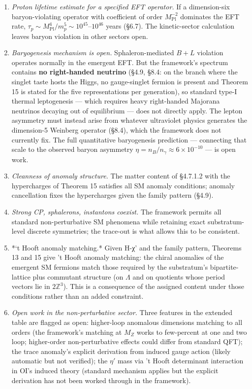 \documentclass[
]{article}
\begin{document}
\begin{enumerate}
\def\labelenumi{(\roman{enumi})}
\item
  \emph{Proton lifetime estimate for a specified EFT operator.} If a
  dimension-six baryon-violating operator with coefficient of order
  \(M_{\mathrm{Pl}}^{-2}\) dominates the EFT rate,
  \(\tau_p \sim M_{\mathrm{Pl}}^4/m_p^5 \sim 10^{45}\)--\(10^{46}\)
  years (§6.7). The kinetic-sector calculation leaves baryon violation
  in other sectors open.
\item
  \emph{Baryogenesis mechanism is open.} Sphaleron-mediated \(B+L\)
  violation operates normally in the emergent EFT. But the framework's
  spectrum contains \textbf{no right-handed neutrino} (§4.9, §8.4: on
  the branch where the singlet taste hosts the Higgs, no gauge-singlet
  fermion is present and Theorem 15 is stated for the five
  representations per generation), so standard type-I thermal
  leptogenesis --- which requires heavy right-handed Majorana neutrinos
  decaying out of equilibrium --- does not directly apply. The lepton
  asymmetry must instead arise from whatever ultraviolet physics
  generates the dimension-5 Weinberg operator (§8.4), which the
  framework does not currently fix. The full quantitative baryogenesis
  prediction --- connecting that scale to the observed baryon asymmetry
  \(\eta = n_B/n_\gamma \approx 6 \times 10^{-10}\) --- is open work.
\item
  \emph{Cleanness of anomaly structure.} The matter content of §4.7.1.2
  with the hypercharges of Theorem 15 satisfies all SM anomaly
  conditions; anomaly cancellation fixes the hypercharges given the
  family pattern (§4.9).
\item
  \emph{Strong CP, sphalerons, instantons coexist.} The framework
  permits all standard non-perturbative SM phenomena while retaining
  exact substratum-level discrete symmetries; the trace-out is what
  allows this to be consistent.
\item
  *`t Hooft anomaly matching.* Given H-χ' and the family pattern,
  Theorems 13 and 15 give 't Hooft anomaly matching: the chiral
  anomalies of the emergent SM fermions match those required by the
  substratum's bipartite-lattice plus commutant structure (on
  \(\Lambda\) and on quotients whose period vectors lie in
  \(2\mathbb Z^3\)). This is a consequence of the assigned content under
  those conditions rather than an added constraint.
\item
  \emph{Open work in the non-perturbative sector.} Three features in the
  extended table are flagged as open: higher-loop anomalous dimensions
  matching to all orders (the framework's matching at \(M_Z\) works to
  few-percent at one and two loop; higher-order non-perturbative effects
  could differ from standard QFT); the trace anomaly's explicit
  derivation from induced gauge action (likely automatic but not
  verified); the \(\eta'\) mass via 't Hooft determinant interaction in
  OI's induced theory (standard mechanism applies but the explicit
  derivation has not been worked through in the framework).
\end{enumerate}
\end{document}

